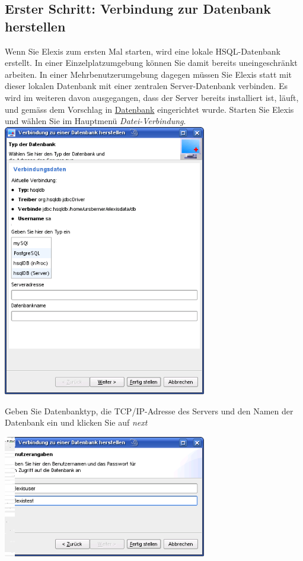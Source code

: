 \subsection{Erster Schritt: Verbindung zur Datenbank herstellen}
Wenn Sie Elexis zum ersten Mal starten, wird eine lokale HSQL-Datenbank erstellt. In einer Einzelplatzumgebung können 
Sie damit bereits uneingeschränkt arbeiten. In einer Mehrbenutzerumgebung dagegen müssen Sie Elexis statt mit dieser 
lokalen Datenbank mit einer zentralen Server-Datenbank verbinden. Es wird im weiteren davon ausgegangen, dass der 
Server bereits installiert ist, läuft, und gemäss dem Vorschlag in
\href{http://www.elexis.ch/jp/index.php?option=content&task=view&id=72}{Datenbank} 
eingerichtet wurde. Starten Sie Elexis und wählen Sie im Hauptmenü
\textit{Datei-Verbindung}. \includegraphics[width=3.5in]{images/verb1.png}

Geben Sie Datenbanktyp, die TCP/IP-Adresse des Servers und den Namen der Datenbank ein und klicken Sie auf \textit{next}

\includegraphics[width=3.5in]{images/verb2.png}

